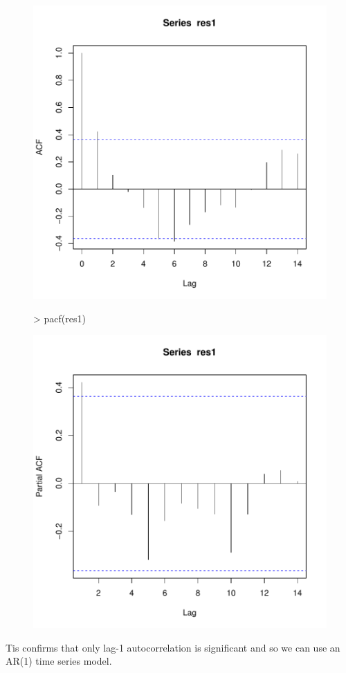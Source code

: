 \documentclass[12pt]{article}
\begin{document}
\begin{itemize}
\begin{itemize}
\begin{figure}[H]
\includegraphics{HW7-004}
\end{figure}
\begin{figure}[H]
\begin{Schunk}
\begin{Sinput}
> pacf(res1)
\end{Sinput}
\end{Schunk}
\includegraphics{HW7-005}
\end{figure}
\end{itemize}
Tis confirms that only lag-1 autocorrelation is significant and so we can use an AR(1) time series model.


\end{itemize}
\end{document}
